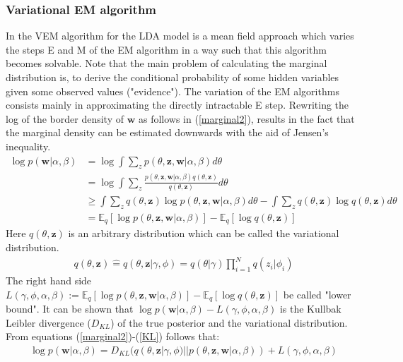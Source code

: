 \documentclass[11pt,a4paper]{article}
\begin{document}
\subsubsection{Variational EM algorithm}

In the VEM algorithm for the LDA model is a mean field approach which varies the steps E and M of the EM algorithm in a way such that this algorithm becomes solvable. Note that the main problem of calculating the marginal distribution is, to derive the conditional probability of some hidden variables given some observed values ("evidence"). The variation of the EM algorithms consists mainly in approximating the directly intractable E step.  Rewriting the log of the border density of $\textbf{w}$ as follows in (\ref{marginal2}), results in the fact that the marginal density can be estimated downwards with the aid of Jensen's inequality.
\begin{align}\label{marginal2}
\log p(\textbf{w}|\alpha, \beta) &= \log \int \sum_{z} 
p(\theta,\textbf{z},\textbf{w}|\alpha,\beta)d\theta\\
& =\log \int \sum_{z} \frac{p(\theta,\textbf{z},\textbf{w}|\alpha,\beta) q(\theta,\textbf{z})}{q(\theta,\textbf{z})}d\theta\\
&\geq \int \sum_{z} q(\theta,\textbf{z})\log p(\theta,\textbf{z},\textbf{w}|\alpha,\beta) d\theta - 
\int \sum_{z} q(\theta,\textbf{z})\log q(\theta,\textbf{z})d\theta\\
&= \mathbb{E}_q[\log p(\theta,\textbf{z},\textbf{w}|\alpha,\beta) ]-
\mathbb{E}_q[\log q(\theta,\textbf{z})] \label{KL}
\end{align}
Here $q(\theta,\textbf{z})$ is an arbitrary distribution which can be called the variational distribution. 
\begin{align}
q(\theta,\textbf{z})\widehat{=}q(\theta,\textbf{z}|\gamma,\phi)
=q(\theta|\gamma) \prod_{i=1}^N q(z_i|\phi_i)
\end{align}
The right hand side $L(\gamma,\phi,\alpha, \beta):=\mathbb{E}_q[\log p(\theta,\textbf{z},\textbf{w}|\alpha,\beta) ]-
\mathbb{E}_q[\log q(\theta,\textbf{z})]$ be called "lower bound". It can be shown that $\log p(\textbf{w}|\alpha, \beta) - L(\gamma,\phi,\alpha, \beta)$ is the Kullbak Leibler divergence ($D_{KL}$) of the true posterior and the variational distribution. From equations (\ref{marginal2})-(\ref{KL}) follows that:
\begin{align}\label{equality}
\log p(\textbf{w}|\alpha, \beta)= D_{KL}(q(\theta,\textbf{z}|\gamma,\phi)||p(\theta,\textbf{z},\textbf{w}|\alpha,\beta)) + L(\gamma,\phi,\alpha, \beta)
\end{align}
\end{document}
